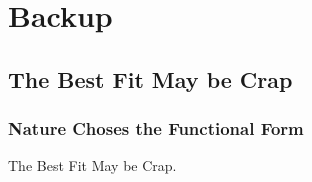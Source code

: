 % 

\section{Backup}

\subsection{The Best Fit May be Crap}
%
\begin{frame}\frametitle{Nature Choses the Functional Form}
	The Best Fit May be Crap.
\end{frame}
%
%
\newcommand{\myscale}[0] {0.60}

